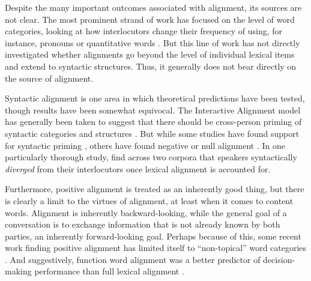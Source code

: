 \documentclass[11pt]{article}
\begin{document}
Despite the many important outcomes associated with alignment, its sources are not clear. The most prominent strand of work has focused on the level of word categories, looking at how interlocutors change their frequency of using, for instance, pronouns or quantitative words \cite{DNMEtAl2012,IrelandEtAl2011}. But this line of work has not directly investigated whether alignments go beyond the level of individual lexical items and extend to syntactic structures. Thus, it generally does not bear directly on the source of alignment.

Syntactic alignment is one area in which theoretical predictions have been tested, though results have been somewhat equivocal. The Interactive Alignment  model has generally been taken to suggest that there should be cross-person priming of syntactic categories and structures \cite{PickeringGarrod2004} . But while some studies have found support for syntactic priming \cite{gries2005syntactic,dubey2005parallelism}, others have found negative or null alignment \cite{HealeyPurverHowes2014,reitter2010priming}. In one particularly thorough study, \cite{HealeyPurverHowes2014} find across two corpora that speakers syntactically \emph{diverged} from their interlocutors once lexical alignment is accounted for.








Furthermore, positive alignment is treated as an inherently good thing, but there is clearly a limit to the virtues of alignment, at least when it comes to content words. Alignment is inherently backward-looking, while the general goal of a conversation is to exchange information that is not already known by both parties, an inherently forward-looking goal. Perhaps because of this, some  recent work finding positive alignment has limited itself to ``non-topical'' word categories \cite{DNMGamonDumais2011,DoyleYurovskyFrank2016}. And suggestively, function word alignment was a better predictor of decision-making performance than full lexical alignment \cite{FusaroliEtAl2012}.
\end{document}
